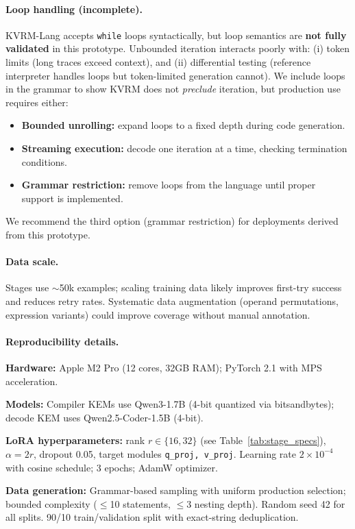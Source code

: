 \documentclass[11pt]{article}
\begin{document}
\paragraph{Loop handling (incomplete).}
KVRM-Lang accepts \texttt{while} loops syntactically, but loop semantics are \textbf{not fully validated} in this prototype.
Unbounded iteration interacts poorly with: (i) token limits (long traces exceed context), and (ii) differential testing (reference interpreter handles loops but token-limited generation cannot).
We include loops in the grammar to show KVRM does not \emph{preclude} iteration, but production use requires either:
\begin{itemize}[leftmargin=*]
  \item \textbf{Bounded unrolling:} expand loops to a fixed depth during code generation.
  \item \textbf{Streaming execution:} decode one iteration at a time, checking termination conditions.
  \item \textbf{Grammar restriction:} remove loops from the language until proper support is implemented.
\end{itemize}
We recommend the third option (grammar restriction) for deployments derived from this prototype.

\paragraph{Data scale.}
Stages use $\sim$50k examples; scaling training data likely improves first-try success and reduces retry rates.
Systematic data augmentation (operand permutations, expression variants) could improve coverage without manual annotation.

\paragraph{Reproducibility details.}
\textbf{Hardware:} Apple M2 Pro (12 cores, 32GB RAM); PyTorch 2.1 with MPS acceleration.

\textbf{Models:} Compiler KEMs use Qwen3-1.7B (4-bit quantized via bitsandbytes); decode KEM uses Qwen2.5-Coder-1.5B (4-bit).

\textbf{LoRA hyperparameters:} rank $r \in \{16, 32\}$ (see Table~\ref{tab:stage_specs}), $\alpha = 2r$, dropout 0.05, target modules \texttt{q\_proj, v\_proj}. Learning rate $2 \times 10^{-4}$ with cosine schedule; 3 epochs; AdamW optimizer.

\textbf{Data generation:} Grammar-based sampling with uniform production selection; bounded complexity ($\leq$10 statements, $\leq$3 nesting depth). Random seed 42 for all splits. 90/10 train/validation split with exact-string deduplication.
\end{document}
